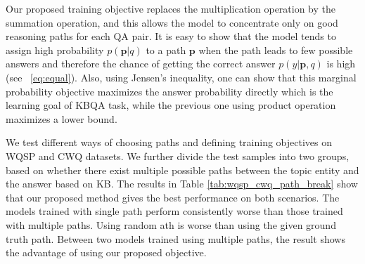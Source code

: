 Our proposed training objective replaces the multiplication operation by the summation operation, and this allows the model to concentrate only on good reasoning paths for each QA pair. It is easy to show that the model tends to assign high probability $p(\mathbf{p}|q)$ to a path $\mathbf{p}$ when the path leads to few possible answers and therefore the chance of getting the correct answer $p(y|\mathbf{p},q)$ is high (see ~\ref{eq:equal}). Also, using Jensen's inequality, one can show that this marginal probability objective maximizes the answer probability directly which is the learning goal of KBQA task, while the previous one using product operation maximizes a lower bound. %


We test different ways of choosing paths and defining training objectives on WQSP and CWQ datasets. We further divide the test samples into two groups, based on whether there exist multiple possible paths between the topic entity and the answer based on KB. The results in Table \ref{tab:wqsp_cwq_path_break} show that our proposed method gives the best performance on both scenarios. The models trained with single path perform consistently worse than those trained with multiple paths. Using random ath is worse than using the given ground truth path. Between two models trained using multiple paths, the result shows the advantage of using our proposed objective.



